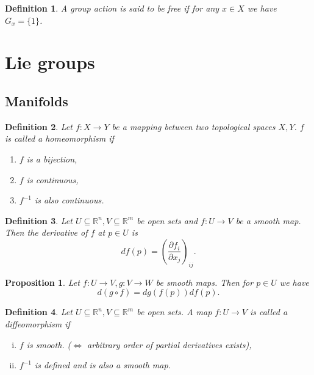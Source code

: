 \documentclass{article}
\newtheorem{proposition}{Proposition}[section]
\newtheorem{definition}{Definition}[section]
\numberwithin{equation}{section}
\begin{document}
\begin{definition}
A group action is said to be free if for any $x\in X$ we have $G_x=\{1\}$.
\end{definition}

\section{Lie groups}

\subsection{Manifolds}

\begin{definition}
Let $f:X\to Y$ be a mapping between two topological spaces $X,Y$. $f$ is called a homeomorphism if 
\begin{enumerate}
\item $f$ is a bijection,
\item $f$ is continuous,
\item $f^{-1}$ is also continuous.
\end{enumerate}
\end{definition}

\begin{definition}
Let $U\subseteq\mathbb{R}^n,V\subseteq\mathbb{R}^m$ be open sets and $f:U\to V$ be a smooth map. Then the derivative of $f$ at $p\in U$ is 
\begin{equation*}
df(p) = \left({\frac {\partial f_i} {\partial x_j}}\right)_{ij}.
\end{equation*}
\end{definition}

\begin{proposition}
Let $f:U\to V, g:V\to W$ be smooth maps. Then for $p\in U$ we have
\begin{equation*}
d(g\circ f) = dg(f(p))df(p).
\end{equation*}
\end{proposition}

\begin{definition}
Let $U\subseteq\mathbb{R}^n,V\subseteq\mathbb{R}^m$ be open sets. A map $f:U\to V$ is called a diffeomorphism if 
\begin{enumerate}[i).]
\item $f$ is smooth. ($\Leftrightarrow$ arbitrary order of partial derivatives exists),
\item $f^{-1}$ is defined and is also a smooth map.
\end{enumerate}
\end{definition}
\end{document}
